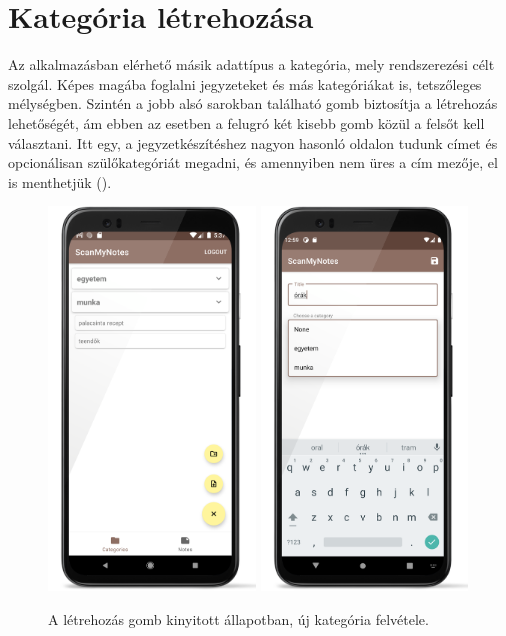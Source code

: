 \section{Kategória létrehozása}
Az alkalmazásban elérhető másik adattípus a kategória, mely rendszerezési célt szolgál. Képes magába foglalni jegyzeteket és más kategóriákat is, tetszőleges mélységben. Szintén a jobb alsó sarokban található gomb biztosítja a létrehozás lehetőségét, ám ebben az esetben a felugró két kisebb gomb közül a felsőt kell választani. Itt egy, a jegyzetkészítéshez nagyon hasonló oldalon tudunk címet és opcionálisan szülőkategóriát megadni, és amennyiben nem üres a cím mezője, el is menthetjük ().

\begin{figure}[!ht]
	\centering
	\includegraphics[width=55mm, keepaspectratio]{figures/floatingbutton_open.png}
	\includegraphics[width=55mm, keepaspectratio]{figures/category_save.png}
	\caption{A létrehozás gomb kinyitott állapotban, új kategória felvétele.}
	\label{fig:NewCategoryScreen}
\end{figure}
\newpage
